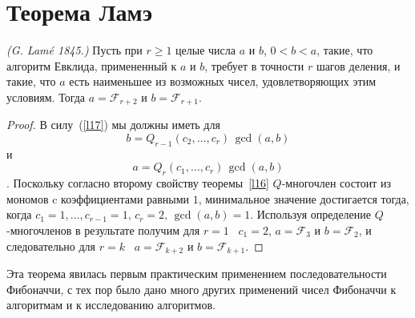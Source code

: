 \documentclass[14pt]{extreport}
\begin{document}
\section{Теорема Ламэ}

\begin{theorem}\emph{(G. Lam\'e 1845.)}
Пусть при $r \geq 1$ целые числа $a$ и $b$, $0 < b < a$, такие, что
алгоритм Евклида, примененный к $a$ и $b$, требует в точности
$r$ шагов деления, и такие, что $a$ есть наименьшее из возможных
чисел, удовлетворяющих этим условиям. Тогда $a =\mathcal{F}_{r+2}$
и $b =\mathcal{F}_{r+1}$.
\label{lam}
\end{theorem}
\begin{proof} В силу~(\ref{l17}) мы должны иметь для
$$b =Q_{r-1}(c_2, \ldots, c_{r})\, \gcd(a, b)$$ и
$$a =Q_{r}(c_1, \ldots, c_{r})\, \gcd(a, b)$$. Поскольку согласно
второму свойству теоремы~\ref{l16} $Q$-многочлен состоит из
мономов c коэффициентами равными $1$,
минимальное значение достигается тогда, когда
$c_1=1, \ldots, c_{r-1}=1, \, c_{r}=2, \, \gcd(a, b) =1$.
Используя определение $Q$-многочленов в результате получим
для $r=1$ \ $c_{1}=2$, $a =\mathcal{F}_{3}$ и $b =\mathcal{F}_{2}$,
и следовательно для $r=k$ \ $a =\mathcal{F}_{k+2}$ и $b =\mathcal{F}_{k+1}$.
\end{proof}
Эта теорема явилась первым практическим применением последовательности
Фибоначчи, с тех пор было дано много других применений чисел
Фибоначчи к алгоритмам и к исследованию алгоритмов.
\end{document}

